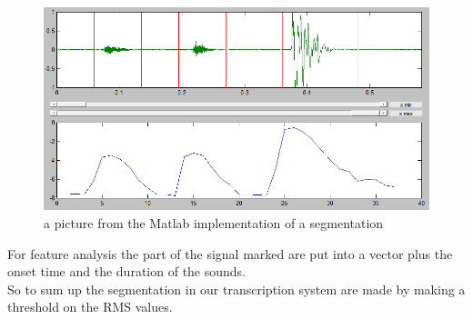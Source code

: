 \begin{figure}[h]
	\begin{center}
		\includegraphics[scale =  0.4]{fig/SegmentationPic.png}
		\caption{a picture from the Matlab implementation of a segmentation}
		\label{SegmentationPic}
	\end{center}
\end{figure}
For feature analysis the part of the signal marked are put into a vector plus the onset time and the duration of the sounds.\\
So to sum up the segmentation in our transcription system are made by making a threshold on the RMS values.